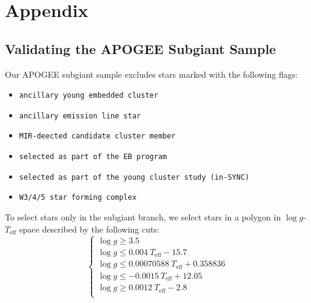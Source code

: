 \documentclass[12pt,oneside]{report}
\begin{document}


\newpage






\appendix
\chapter*{Appendix}
\renewcommand{\thesection}{A.\arabic{section}}
\renewcommand\thefigure{A.\arabic{figure}}    
\setcounter{figure}{0}



\section{Validating the APOGEE Subgiant Sample}\label{sec:jack}
Our APOGEE subgiant sample excludes stars marked with the following flags:
\begin{itemize}
\item \texttt{ancillary young embedded cluster}
\item \texttt{ancillary emission line star}
\item \texttt{MIR-deected candidate cluster member}
\item \texttt{selected as part of the EB program}
\item \texttt{selected as part of the young cluster study (in-SYNC)}
\item \texttt{W3/4/5 star forming complex}
\end{itemize}

To select stars only in the subgiant branch, we select stars in a polygon in $\log g$-$T_\text{eff}$ space described by the following cuts:
\begin{equation}
\begin{cases}
\log g \geq 3.5 \\
\log g \leq 0.004\ T_\text{eff} - 15.7 \\
\log g \leq 0.00070588\ T_\text{eff} + 0.358836 \\
\log g \leq -0.0015\ T_\text{eff} + 12.05 \\
\log g \geq 0.0012\ T_\text{eff} - 2.8 \\
\end{cases}
\end{equation}
\end{document}
